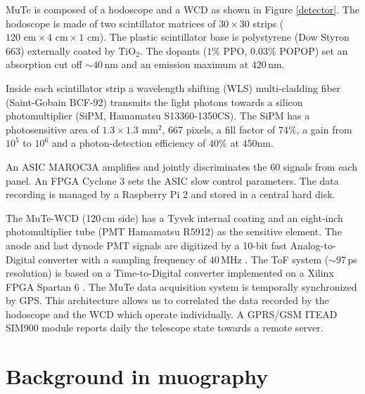 \documentclass{PoS}
\begin{document}
MuTe is composed of a hodoscope and a WCD as shown in Figure \ref{detector}. The hodoscope is made of two scintillator matrices of $30 \times 30$ strips ($120 \textrm{ cm} \times 4 \textrm{ cm} \times 1 \textrm{ cm}$). The plastic scintillator base is polystyrene (Dow Styron $663$) externally coated by TiO$_2$. The dopants ($1\%$  PPO,  $0.03 \%$ POPOP) set an absorption cut off $\sim 40$\,nm and an emission maximum at $420$\,nm. 

Inside each scintillator strip a wavelength shifting (WLS) multi-cladding fiber  (Saint-Gobain BCF-92) transmits the light photons towards a silicon photomultiplier (SiPM, Hamamatsu S13360-1350CS). The SiPM has a photosensitive area of $1.3 \times 1.3 \textrm{ mm}^2$, $667$ pixels, a fill factor of $74\%$, a gain from $10^5$ to $10^6$ and a photon-detection efficiency of $40 \%$ at $450 \textrm{nm}$.


An ASIC MAROC3A amplifies and jointly discriminates the 60 signals from each panel. An FPGA Cyclone 3 sets the ASIC slow control parameters. The data recording is managed by a Raspberry Pi 2 and stored in a central hard disk.

The MuTe-WCD (120\,cm side) has a Tyvek internal coating and an eight-inch photomultiplier tube (PMT Hamamatsu R5912) as the sensitive element. The anode and last dynode  PMT signals are digitized by a 10-bit fast Analog-to-Digital converter with a sampling frequency of 40\,MHz \cite{SofoHaro2016}. The ToF system ($\sim$97\,ps resolution) is based on a Time-to-Digital converter implemented on a Xilinx FPGA Spartan 6 \cite{PeaRodrguez2020}. 
The MuTe data acquisition system is temporally synchronized by GPS. This architecture allows us to correlated the data recorded by the hodoscope and the WCD which operate individually. A GPRS/GSM ITEAD SIM900 module reports daily the telescope state towards a remote server.

\section{Background in muography}
\end{document}
